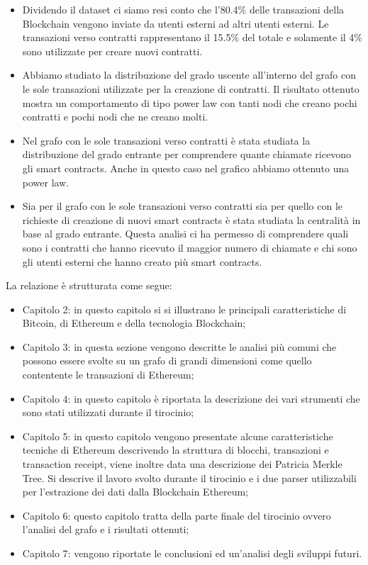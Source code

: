 \documentclass[12pt]{report}
\begin{document}
\begin{itemize}
    \item Dividendo il dataset ci siamo resi conto che l'80.4\% delle transazioni della Blockchain vengono inviate da utenti esterni ad altri utenti esterni. Le transazioni verso contratti rappresentano il 15.5\% del totale e solamente il 4\% sono utilizzate per creare nuovi contratti.
    \item Abbiamo studiato la distribuzione del grado uscente all'interno del grafo con le sole transazioni utilizzate per la creazione di contratti. Il risultato ottenuto mostra un comportamento di tipo power law con tanti nodi che creano pochi contratti e pochi nodi che ne creano molti.
    \item Nel grafo con le sole transazioni verso contratti è stata studiata la distribuzione del grado entrante per comprendere quante chiamate ricevono gli smart contracts. 
    Anche in questo caso nel grafico abbiamo ottenuto una power law.
    \item Sia per il grafo con le sole transazioni verso contratti sia per quello con le richieste di creazione di nuovi smart contracts è stata studiata la centralità in base al grado entrante.
    Questa analisi ci ha permesso di comprendere quali sono i contratti che hanno ricevuto il maggior numero di chiamate e chi sono gli utenti esterni che hanno creato più smart contracts.
    
\end{itemize}

La relazione è strutturata come segue:

\begin{itemize}
    \item Capitolo 2: in questo capitolo si si illustrano le principali caratteristiche di Bitcoin, di Ethereum e della tecnologia Blockchain;
    \item Capitolo 3: in questa sezione vengono descritte le analisi più comuni che possono essere svolte su un grafo di grandi dimensioni come quello contentente le transazioni di Ethereum;
    \item Capitolo 4: in questo capitolo è riportata la descrizione dei vari strumenti che sono stati utilizzati durante il tirocinio;
    \item Capitolo 5: in questo capitolo vengono presentate alcune caratteristiche tecniche di Ethereum descrivendo la struttura di blocchi, transazioni e transaction receipt, viene inoltre data una descrizione dei Patricia Merkle Tree.
    \newline Si descrive il lavoro svolto durante il tirocinio e i due parser utilizzabili per l'estrazione dei dati dalla Blockchain Ethereum;
    \item Capitolo 6: questo capitolo tratta della parte finale del tirocinio ovvero l'analisi del grafo e i risultati ottenuti;
    \item Capitolo 7: vengono riportate le conclusioni ed un'analisi degli sviluppi futuri.
\end{itemize}
\end{document}

